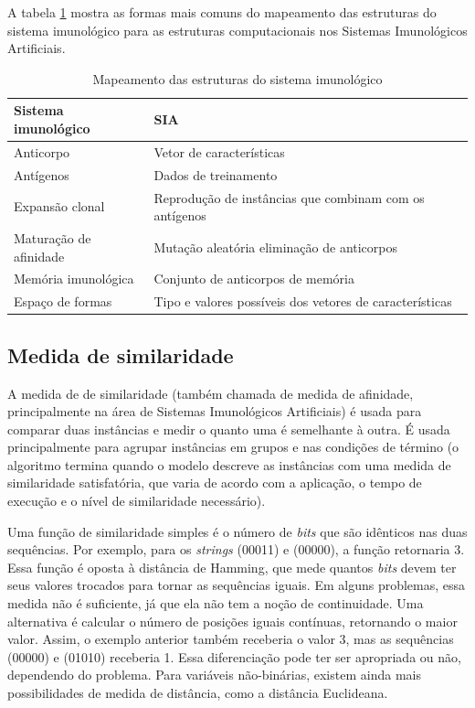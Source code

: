 A tabela \ref{tab:ais_map} mostra as formas mais comuns do mapeamento das estruturas do sistema imunológico para as estruturas computacionais nos Sistemas Imunológicos Artificiais.

\begin{table}[h!]
    \vspace{1cm}
    \caption{Mapeamento das estruturas do sistema imunológico \cite{Andrew2003}}
    \centering
    \begin{tabular}{l l}
        \hline
        Sistema imunológico     & SIA                                                     \\
        \hline
        Anticorpo               & Vetor de características                                \\
        Antígenos               & Dados de treinamento                                    \\
        Expansão clonal         & Reprodução de instâncias que combinam com os antígenos  \\
        Maturação de afinidade  & Mutação aleatória eliminação de anticorpos              \\
        Memória imunológica     & Conjunto de anticorpos de memória                       \\
        Espaço de formas        & Tipo e valores possíveis dos vetores de características \\
        \hline
    \end{tabular}
    \label{tab:ais_map}
    \vspace{1cm}
\end{table}

\subsection{Medida de similaridade}

A medida de de similaridade (também chamada de medida de afinidade, principalmente na área de Sistemas Imunológicos Artificiais) é usada para comparar duas instâncias e medir o quanto uma é semelhante à outra. É usada principalmente para agrupar instâncias em grupos e nas condições de término (o algoritmo termina quando o modelo descreve as instâncias com uma medida de similaridade satisfatória, que varia de acordo com a aplicação, o tempo de execução e o nível de similaridade necessário).

Uma função de similaridade simples é o número de \emph{bits} que são idênticos nas duas sequências. Por exemplo, para os \emph{strings} (00011) e (00000), a função retornaria 3. Essa função é oposta à distância de Hamming, que mede quantos \emph{bits} devem ter seus valores trocados para tornar as sequências iguais. Em alguns problemas, essa medida não é suficiente, já que ela não tem a noção de continuidade. Uma alternativa é calcular o número de posições iguais contínuas, retornando o maior valor. Assim, o exemplo anterior também receberia o valor 3, mas as sequências (00000) e (01010) receberia 1. Essa diferenciação pode ter ser apropriada ou não, dependendo do problema. Para variáveis não-binárias, existem ainda mais possibilidades de medida de distância, como a distância Euclideana.

